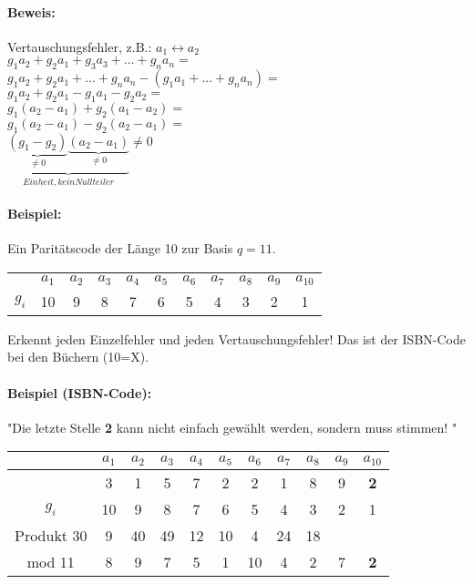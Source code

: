 \paragraph{Beweis:} Vertauschungsfehler, z.B.: $ a_1 \leftrightarrow a_2$\\
$g_1 a_2 + g_2 a_1 + g_3 a_3 + ... + g_n a_n =$\\
$g_1 a_2 + g_2 a_1 + ... + g_n a_n - (g_1 a_1 + ... + g_n a_n) =$\\
$g_1 a_2 + g_2 a_1 - g_1 a_1 - g_2 a_2 =$\\
$g_1(a_2 - a_1) + g_2(a_1 - a_2) =$\\
$g_1(a_2 - a_1) - g_2(a_2 - a_1) =$\\
$\underbrace{\underbrace{(g_1 - g_2)}_{\neq 0} \underbrace{(a_2-a_1)}_{\neq 0}}_{Einheit, kein Nullteiler} \neq 0$\\


\paragraph{Beispiel:} Ein Paritätscode der Länge 10 zur Basis $q=11$.\\ 

\begin{tabular}{ccccccccccc}
 & $a_1$ & $a_2$ & $a_3$ & $a_4$ & $a_5$ & $a_6 $ & $a_7 $ & $a_8 $ & $a_9 $ & $a_{10}$\\ 
$g_i$ & 10 & 9 & 8 & 7 & 6 & 5 & 4 & 3 & 2 & 1\\ 
\end{tabular} 
Erkennt jeden Einzelfehler und jeden Vertauschungsfehler! Das ist der ISBN-Code bei den Büchern (10=X).

\paragraph{Beispiel (ISBN-Code):} "Die letzte Stelle \textbf{2} kann nicht einfach gewählt werden, sondern muss stimmen! "\\
\begin{tabular}{c|cccccccccc}
 & $a_1$ & $a_2$ & $a_3$ & $a_4$ & $a_5$ & $a_6 $ & $a_7 $ & $a_8 $ & $a_9 $ & $a_{10}$\\ \hline
 & 3 & 1 & 5 & 7 & 2 & 2 & 1 & 8 & 9 & \textbf{2}\\
$g_i$ & 10 & 9 & 8 & 7 & 6 & 5 & 4 & 3 & 2 & 1\\ 
Produkt 30 & 9 & 40 & 49 & 12 & 10 & 4 & 24 & 18 & \\
mod 11 & 8 & 9 & 7 & 5 & 1 & 10 & 4 & 2 & 7 & \textbf{2}\\
\end{tabular} 

